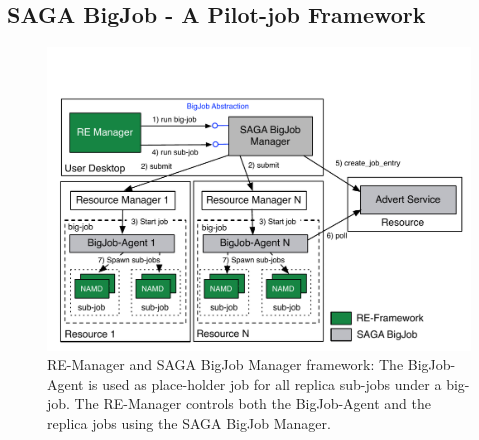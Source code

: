 \documentclass{rspublic}
\begin{document}


\subsection{SAGA BigJob - A Pilot-job Framework}
\label{sec:BigJob}


\begin{figure}[t]
      \centering
          \includegraphics[scale=0.45]{../figures/Bigjob_arch.pdf}
          \caption{\footnotesize RE-Manager and SAGA BigJob Manager
            framework: The BigJob-Agent is used as place-holder job
            for all replica sub-jobs under a big-job. The RE-Manager
            controls both the BigJob-Agent and the replica jobs using
            the SAGA BigJob Manager.  }
      \label{fig:bigjob}
\end{figure}
\end{document}
